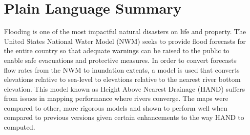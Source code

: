 \section*{Plain Language Summary}
Flooding is one of the most impactful natural disasters on life and property.
The United States National Water Model (NWM) seeks to provide flood forecasts for the entire country so that adequate warnings can be raised to the public to enable safe evacuations and protective measures.
In order to convert forecasts flow rates from the NWM to inundation extents, a model is used that converts elevations relative to sea-level to elevations relative to the nearest river bottom elevation.
This model known as Height Above Nearest Drainage (HAND) suffers from issues in mapping performance where rivers converge.
The maps were compared to other, more rigorous models and shown to perform well when compared to previous versions given certain enhancements to the way HAND to computed.
%
